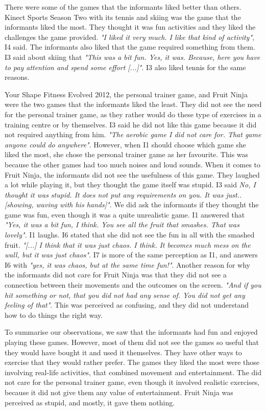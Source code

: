 There were some of the games that the informants liked better than others. Kinect Sports Season Two with its tennis and skiing was the game that the informants liked the most. They thought it was fun activities and they liked the challenges the game provided. \emph{"I liked it very much. I like that kind of activity"}, I4 said. The informants also liked that the game required something from them. I3 said about skiing that \emph{"This was a bit fun. Yes, it was. Because, here you have to pay attention and spend some effort [...]"}. I3 also liked tennis for the same reasons.  

Your Shape Fitness Evolved 2012, the personal trainer game, and Fruit Ninja were the two games that the informants liked the least. They did not see the need for the personal trainer game, as they rather would do these type of exercises in a training centre or by themselves. I3 said he did not like this game because it did not required anything from him. \emph{"The aerobic game I did not care for. That game anyone could do anywhere"}. However, when I1 should choose which game she liked the most, she chose the personal trainer game as her favourite. This was because the other games had too much noises and loud sounds. When it comes to Fruit Ninja, the informants did not see the usefulness of this game. They laughed a lot while playing it, but they thought the game itself was stupid. I3 said \emph{No, I thought it was stupid. It does not put any requirements on you. It was just.. [showing, waving with his hands]"}. We did ask the informants if they thought the game was fun, even though it was a quite unrealistic game. I1 answered that \emph{"Yes, it was a bit fun, I think. You see all the fruit that smashes. That was lovely"}. I1 laughs. I6 stated that she did not see the fun in all with the smashed fruit. \emph{"[...] I think that it was just chaos. I think. It becomes much mess on the wall, but it was just chaos"}. I7 is more of the same perception as I1, and answers I6 with \emph{"yes, it was chaos, but at the same time fun!"}. Another reason for why the informants did not care for Fruit Ninja was that they did not see a connection between their movements and the outcomes on the screen. \emph{"And if you hit something or not, that you did not had any sense of. You did not get any feeling of that"}. This was perceived as confusing, and they did not understand how to do things the right way. 

To summarise our observations, we saw that the informants had fun and enjoyed playing these games. However, most of them did not see the games so useful that they would have bought it and used it themselves. They have other ways to exercise that they would rather prefer. The games they liked the most were those involving real-life activities, that combined movement and entertainment. The did not care for the personal trainer game, even though it involved realistic exercises, because it did not give them any value of entertainment. Fruit Ninja was perceived as stupid, and mostly, it gave them nothing.    

